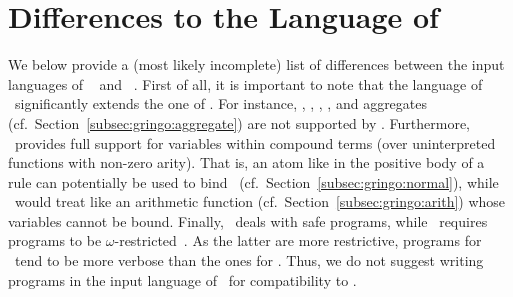 \section{Differences to the Language of \lparse}\label{sec:lparse}


We below provide a (most likely incomplete) list of differences between the
input languages of \gringo~\cite{gescth07a} and \lparse~\cite{lparseManual}.
First of all, it is important to note that the language of \gringo\
significantly extends the one of \lparse.
For instance, 
, 
,
,
, and
aggregates (cf.\ Section~\ref{subsec:gringo:aggregate})
are not supported by \lparse.
Furthermore, \gringo\ provides full support for variables within compound terms
(over uninterpreted functions with non-zero arity).
That is, an atom like  in the positive body of a rule
can potentially be used to bind~\var{X} (cf.\ Section~\ref{subsec:gringo:normal}),
while \lparse\ would treat \code{\const{f}(\var{X})} like an arithmetic
function (cf.\ Section~\ref{subsec:gringo:arith}) whose variables cannot be bound.
Finally, \gringo\ deals with safe programs,
while \lparse\ requires programs to be $\omega$-restricted~\cite{syrjanen01a}.
As the latter are more restrictive,
programs for \lparse\ tend to be more verbose than the ones for \gringo.
Thus, we do not suggest writing programs in the input language of \gringo\
for compatibility to \lparse.

